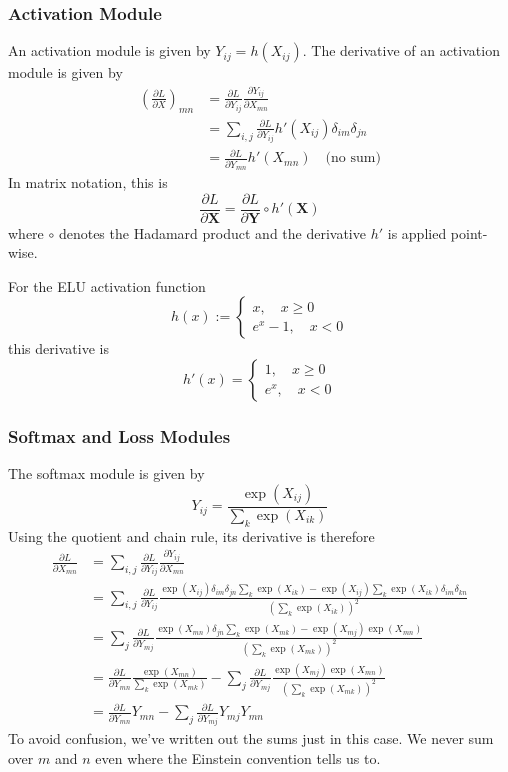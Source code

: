 \documentclass{article}
\newcommand{\pd}[2]{\frac{\partial #1}{\partial #2}}
\begin{document}
\subsubsection{Activation Module}
An activation module is given by \(Y_{ij} = h(X_{ij})\).
The derivative of an activation module is given by
\begin{align*}
  \left(\pd{L}{X}\right)_{mn} &= \pd{L}{Y_{ij}}\pd{Y_{ij}}{X_{mn}}\\
                              &= \sum_{i, j} \pd{L}{Y_{ij}}h'(X_{ij}) \delta_{im}\delta_{jn}\\
                              &= \pd{L}{Y_{mn}}h'(X_{mn}) \quad \text{(no sum)}
\end{align*}
In matrix notation, this is
\[\pd{L}{\bm X} = \pd{L}{\bm Y} \circ h'(\bm X)\]
where \(\circ\) denotes the Hadamard product and the derivative \(h'\) is applied point-wise.

For the ELU activation function
\[h(x) := \begin{cases}x, \quad x \geq 0\\ e^x - 1, \quad x < 0\end{cases}\]
this derivative is
\[h'(x) = \begin{cases}1, \quad x \geq 0\\ e^x, \quad x < 0\end{cases}\]

\subsubsection{Softmax and Loss Modules}
The softmax module is given by
\[Y_{ij} = \frac{\exp(X_{ij})}{\sum_k \exp(X_{ik})}\]
Using the quotient and chain rule, its derivative is therefore
\begin{align*}
  \pd{L}{X_{mn}} &= \sum_{i, j} \pd{L}{Y_{ij}} \pd{Y_{ij}}{X_{mn}}\\
               &= \sum_{i, j} \pd{L}{Y_{ij}} \frac{\exp(X_{ij})\delta_{im}\delta_{jn}\sum_k \exp(X_{ik})
                 - \exp(X_{ij})\sum_k \exp(X_{ik}) \delta_{im}\delta_{kn}}{\left(\sum_k \exp(X_{ik})\right)^2}\\
               &= \sum_j \pd{L}{Y_{mj}} \frac{\exp(X_{mn})\delta_{jn}\sum_k \exp(X_{mk})
                 - \exp(X_{mj})\exp(X_{mn})}{\left(\sum_k \exp(X_{mk})\right)^2}\\
               &= \pd{L}{Y_{mn}} \frac{\exp(X_{mn})}{\sum_k \exp(X_{mk})}
                 - \sum_j \pd{L}{Y_{mj}} \frac{\exp(X_{mj})\exp(X_{mn})}{\left(\sum_k \exp(X_{mk})\right)^2}\\
               &= \pd{L}{Y_{mn}} Y_{mn} - \sum_j \pd{L}{Y_{mj}} Y_{mj} Y_{mn}
\end{align*}
To avoid confusion, we've written out the sums just in this case. We never sum over \(m\) and \(n\)
even where the Einstein convention tells us to.
\end{document}
